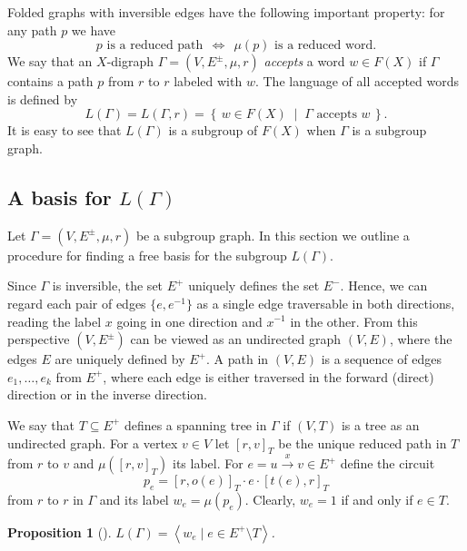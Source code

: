 \documentclass[12pt,oneside]{amsart}
\newtheorem{proposition}[theorem]{Proposition}
\theoremstyle{definition}
\theoremstyle{case}
\newcommand{\gp}[1]{{\left\langle #1 \right\rangle}}
\newcommand{\Set}[2]{\left\{\, #1 \;\middle|\; #2 \,\right\}}%
\begin{document}
Folded graphs with inversible edges have the following important property: 
for any path $p$ we have
$$
p \mbox{ is a reduced path}
\ \ \Leftrightarrow\ \ 
\mu(p) \mbox{ is a reduced word.}
$$
We say that an $X$-digraph $\Gamma=(V,E^\pm,\mu,r)$
\emph{accepts} a word $w\in F(X)$ if
$\Gamma$ contains a path $p$ from $r$ to $r$ labeled with $w$.
The language of all accepted words is defined by
\begin{equation}\label{eq:L}
L(\Gamma) = L(\Gamma,r) = \Set{w\in F(X)}{\Gamma \mbox{ accepts } w}.
\end{equation}
It is easy to see that $L(\Gamma)$ is a subgroup of $F(X)$ when $\Gamma$ is a subgroup graph.


\subsection{A basis for $L(\Gamma)$}
\label{se:sbgp-basis}

Let $\Gamma=(V,E^\pm,\mu,r)$ be a subgroup graph.
In this section we outline a procedure for
finding a free basis for the subgroup $L(\Gamma)$.

Since $\Gamma$ is inversible, the set $E^+$ uniquely defines the set $E^-$.
Hence, we can regard each pair of edges $\{e,e^{-1}\}$
as a single edge traversable in both directions, reading the label 
$x$ going in one direction and $x^{-1}$ in the other. 
From this perspective
$(V,E^\pm)$ can be viewed as an undirected graph $(V,E)$, 
where the edges $E$ are uniquely defined by $E^+$. 
A path in $(V,E)$ is a sequence of edges 
$e_1,\dots,e_k$ from $E^+$,
where each edge is either traversed in the forward (direct) direction 
or in the inverse direction.

We say that $T\subseteq E^+$ defines a spanning tree in $\Gamma$
if $(V,T)$ is a tree as an undirected graph. For a vertex $v\in V$
let $[r,v]_T$ be the unique reduced path in $T$ from $r$ to $v$
and $\mu([r,v]_T)$ its label. 
For $e=u\stackrel{x}{\to} v\in E^+$ define the circuit 
\begin{equation}\label{eq:p_e}
p_e = [r,o(e)]_T \cdot e\cdot  [t(e),r]_T
\end{equation}
from $r$ to $r$ in $\Gamma$ and its label $w_e = \mu(p_e)$.
Clearly, $w_e=1$ if and only if $e\in T$.

\begin{proposition}[{{\cite[Lemma 6.1]{Kapovich_Miasnikov:2002}}}]
$L(\Gamma) = \gp{w_e \mid e\in E^+\setminus T}$.
\end{proposition}
\end{document}

